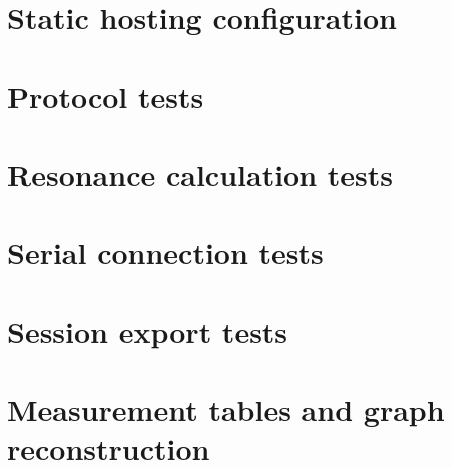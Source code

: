 

\section{Static hosting configuration}




\section{Protocol tests}




\section{Resonance calculation tests}




\section{Serial connection tests}




\section{Session export tests}




\section{Measurement tables and graph reconstruction}


